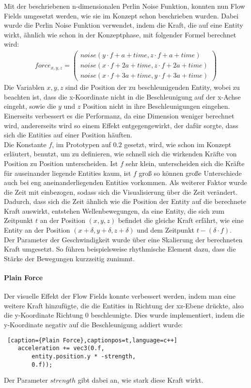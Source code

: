 \documentclass[11pt,a4paper]{article}
\begin{document}
\vspace{10pt}
\noindent
Mit der beschriebenen n-dimensionalen Perlin Noise Funktion, konnten nun Flow Fields umgesetzt werden, wie sie im Konzept schon beschrieben wurden. Dabei wurde die Perlin Noise Funktion verwendet, indem die Kraft, die auf eine Entity wirkt, ähnlich wie schon in der Konzeptphase, mit folgender Formel berechnet wird:
\begin{align}
force_{x,y,z} = \left(
\begin{array}{c}
noise(y \cdot f + a + time, z \cdot f + a + time) \\
noise(x \cdot f + 2a + time, z \cdot f + 2a + time) \\
noise(x \cdot f + 3a + time, y \cdot f + 3a + time)
\end{array}
\right)
\end{align}
\noindent
Die Variablen $x, y, z$ sind die Position der zu beschleunigenden Entity, wobei zu beachten ist, dass die x-Koordinate nicht in die Beschleunigung auf der x-Achse eingeht, sowie die $y$ und $z$ Position nicht in ihre Beschleunigungen eingehen. Einerseits verbessert es die Performanz, da eine Dimension weniger berechnet wird, andererseits wird so einem Effekt entgegengewirkt, der dafür sorgte, dass sich die Entities auf einer Position häuften.\\
Die Konstante $f$, im Prototypen auf $0.2$ gesetzt, wird, wie schon im Konzept erläutert, benutzt, um zu definieren, wie schnell sich die wirkenden Kräfte von Position zu Position unterscheiden. Ist $f$ sehr klein, unterscheiden sich die Kräfte für auseinander liegende Entities kaum, ist $f$ groß so können große Unterschiede auch bei eng aneinanderliegenden Entities vorkommen. Als weiterer Faktor wurde die Zeit mit einbezogen, sodass sich die Visualisierung über die Zeit verändert. Dadurch, dass sich die Zeit ähnlich wie die Position der Entity auf die berechnete Kraft auswirkt, entstehen Wellenbewegungen, da eine Entity, die sich zum Zeitpunkt $t$ an der Position $(x, y, z)$ befindet die gleiche Kraft erfährt, wie eine Entity an der Position $(x+\delta, y+\delta, z+\delta)$ und dem Zeitpunkt $t-(\delta \cdot f)$.\\
Der Parameter der Geschwindigkeit wurde über eine Skalierung der berechneten Kraft umgesetzt. So führen beispielsweise rhythmische Element dazu, dass die Stärke der Bewegungen kurzzeitig zunimmt.

\paragraph{Plain Force}
Der visuelle Effekt der Flow Fields konnte verbessert werden, indem man eine weitere Kraft hinzufügte, die die Entities in Richtung der xz-Ebene drückte, also die y-Koordinate Richtung 0 beschleunigte. Dies wurde implementiert, indem die y-Koordinate negativ auf die Beschleunigung addiert wurde:
\begin{lstlisting} [caption={Plain Force},captionpos=t,language=c++]
	acceleration += vec3(0.f,
		entity.position.y * -strength,
		0.f));
\end{lstlisting}
\noindent
Der Parameter $strength$ gibt dabei an, wie stark diese Kraft wirkt.\\
\end{document}
